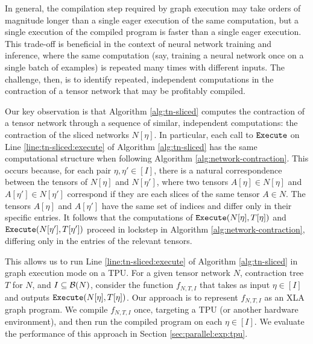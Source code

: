 In general, the compilation step required by graph execution may take orders of magnitude longer than a single eager execution of the same computation, but a single execution of the compiled program is faster than a single eager execution. 
This trade-off is beneficial in the context of neural network training and inference, where the same computation (say, training a neural network once on a single batch of examples) is repeated many times with different inputs.
The challenge, then, is to identify repeated, independent computations in the contraction of a tensor network that may be profitably compiled.

Our key observation is that Algorithm \ref{alg:tn-sliced} computes the contraction of a tensor network through a sequence of similar, independent computations: the contraction of the sliced networks $N[\eta]$. In particular, each call to $\texttt{\upshape Execute}$ on Line \ref{line:tn-sliced:execute} of Algorithm \ref{alg:tn-sliced} has the same computational structure when following Algorithm \ref{alg:network-contraction}. This occurs because, for each pair $\eta, \eta' \in [I]$, there is a natural correspondence between the tensors of $N[\eta]$ and $N[\eta']$, where two tensors $A[\eta] \in N[\eta]$ and $A[\eta'] \in N[\eta']$ correspond if they are each slices of the same tensor $A \in N$. The tensors $A[\eta]$ and $A[\eta']$ have the same set of indices and differ only in their specific entries.
It follows that the computations of $\texttt{\upshape Execute}(N[\eta], T[\eta])$ and $\texttt{\upshape Execute}(N[\eta'], T[\eta'])$ proceed in lockstep in Algorithm \ref{alg:network-contraction}, differing only in the entries of the relevant tensors.

This allows us to run Line \ref{line:tn-sliced:execute} of Algorithm \ref{alg:tn-sliced} in graph execution mode on a TPU.
For a given tensor network $N$, contraction tree $T$ for $N$, and $I \subseteq \mathcal{B}(N)$, consider the function $f_{N,T,I}$ that takes as input $\eta \in [I]$ and outputs $\texttt{\upshape Execute}(N[\eta], T[\eta])$.
Our approach is to represent $f_{N,T,I}$ as an XLA graph program.
We compile $f_{N,T,I}$ once, targeting a TPU (or another hardware environment), and then run the compiled program on each $\eta \in [I]$.
We evaluate the performance of this approach in Section \ref{sec:parallel:exp:tpu}.

